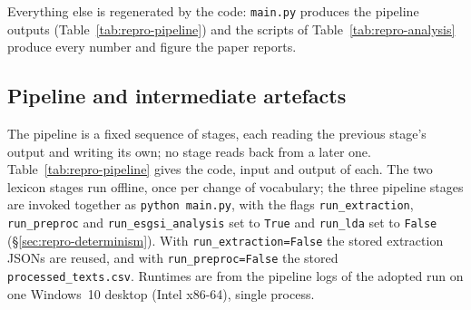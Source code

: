 Everything else is regenerated by the code: \nolinkurl{main.py} produces the
pipeline outputs (Table~\ref{tab:repro-pipeline}) and the scripts of
Table~\ref{tab:repro-analysis} produce every number and figure the paper
reports.

\subsection{Pipeline and intermediate artefacts}
\label{sec:repro-pipeline}

The pipeline is a fixed sequence of stages, each reading the previous
stage's output and writing its own; no stage reads back from a later one.
Table~\ref{tab:repro-pipeline} gives the code, input and output of each. The
two lexicon stages run offline, once per change of vocabulary; the three
pipeline stages are invoked together as \texttt{python main.py}, with the
flags \texttt{run\_extraction}, \texttt{run\_preproc} and
\texttt{run\_esgsi\_analysis} set to \texttt{True} and \texttt{run\_lda} set
to \texttt{False} (\S\ref{sec:repro-determinism}). With
\texttt{run\_extraction=False} the stored extraction JSONs are reused, and
with \texttt{run\_preproc=False} the stored \nolinkurl{processed_texts.csv}.
Runtimes are from the pipeline logs of the adopted run on one Windows~10
desktop (Intel x86-64), single process.

